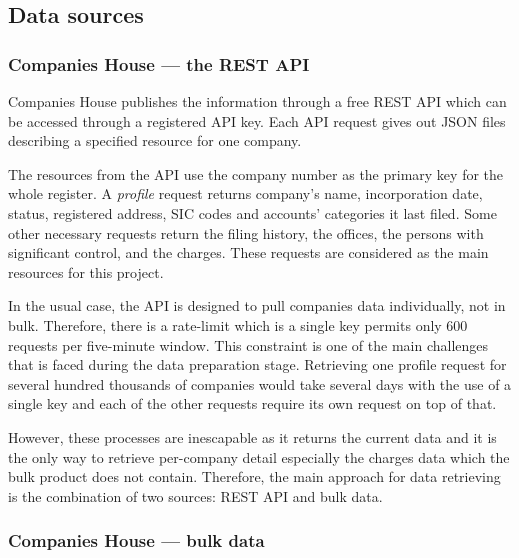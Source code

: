 \documentclass[ %
                    author={Natchalin Iwsakul \\[0.4em] Inkaphol Siriwongwattana \\[0.4em] Tanaphan Kummaraphat \\[0.6em] Patorn Srisupap},,
                supervisor={Fernando Moreno-Pino},
                    degree={MSc},
                     title={Propensity Modelling for SME Commercial Lending Using Open Public Data
},
                  subtitle={Companies House and GDELT as predictors of first-time borrowing},
                      type={},
                      year={2026}]{dissertation}
\begin{document}
\subsection{Data sources}
\label{sec:datasources}

\subsubsection{Companies House --- the REST API}
\label{sec:ch-api}

Companies House publishes the information through a free REST API which can be accessed through a registered API key. Each API request gives out JSON files describing a specified resource for one company.

The resources from the API use the company number as the primary key for the whole register. A \textit{profile} request returns company's name, incorporation date, status, registered address, SIC codes and accounts' categories it last filed. Some other necessary requests return the filing history, the offices, the persons with significant control, and the charges. These requests are considered as the main resources for this project.

In the usual case, the API is designed to pull companies data individually, not in bulk. Therefore, there is a rate-limit which is a single key permits only 600 requests per five-minute window. This constraint is one of the main challenges that is faced during the data preparation stage. Retrieving one profile request for several hundred thousands of companies would take several days with the use of a single key and each of the other requests require its own request on top of that.

However, these processes are inescapable as it returns the current data and it is the only way to retrieve per-company detail especially the charges data which the bulk product does not contain. Therefore, the main approach for data retrieving is the combination of two sources: REST API and bulk data.

\subsubsection{Companies House --- bulk data}
\label{sec:ch-bulk}
\end{document}
